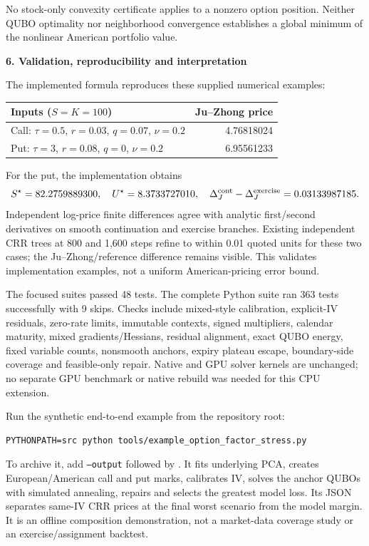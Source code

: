 \documentclass[11pt,a4paper]{article}
\begin{document}
No stock-only convexity certificate applies to a nonzero option position.
Neither QUBO optimality nor neighborhood convergence establishes a global
minimum of the nonlinear American portfolio value.

\newpage
\textbf{6. Validation, reproducibility and interpretation}

The implemented formula reproduces these supplied numerical examples:
\begin{center}\small
\begin{tabular}{p{.62\linewidth}r}
\toprule
Inputs ($S=K=100$) & Ju--Zhong price\\\midrule
Call: $\tau=0.5$, $r=0.03$, $q=0.07$, $\nu=0.2$ & 4.76818024\\
Put: $\tau=3$, $r=0.08$, $q=0$, $\nu=0.2$ & 6.95561233\\\bottomrule
\end{tabular}\end{center}
For the put, the implementation obtains
\[
 S^\star=82.2759889300,\quad U^\star=8.3733727010,\quad
 \Delta_J^{\rm cont}-\Delta_J^{\rm exercise}=0.03133987185.
\]
Independent log-price finite differences agree with analytic first/second
derivatives on smooth continuation and exercise branches. Existing independent
CRR trees at 800 and 1,600 steps refine to within 0.01 quoted units for these
two cases; the Ju--Zhong/reference difference remains visible. This validates
implementation examples, not a uniform American-pricing error bound.

The focused suites passed 48 tests. The complete Python suite ran 363 tests
successfully with 9 skips. Checks include mixed-style calibration, explicit-IV
residuals, zero-rate limits, immutable contexts, signed multipliers, calendar
maturity, mixed gradients/Hessians, residual alignment, exact QUBO energy,
fixed variable counts, nonsmooth anchors, expiry plateau escape, boundary-side
coverage and feasible-only repair. Native and GPU solver kernels are unchanged;
no separate GPU benchmark or native rebuild was needed for this CPU extension.

Run the synthetic end-to-end example from the repository root:
\begin{verbatim}
PYTHONPATH=src python tools/example_option_factor_stress.py
\end{verbatim}
To archive it, add \texttt{--output} followed by
.
It fits underlying PCA, creates European/American call and put marks, calibrates
IV, solves the anchor QUBOs with simulated annealing, repairs and selects the
greatest model loss. Its JSON separates same-IV CRR prices at the final worst
scenario from the model margin. It is an offline composition demonstration,
not a market-data coverage study or an exercise/assignment backtest.
\end{document}
